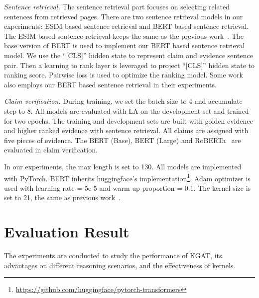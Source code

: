 \documentclass[11pt,a4paper]{article}
\begin{document}
\textit{Sentence retrieval.} The sentence retrieval part focuses on selecting related sentences from retrieved pages. There are two sentence retrieval models in our experiments: ESIM based sentence retrieval and BERT based sentence retrieval. The ESIM based sentence retrieval keeps the same as the previous work~\cite{hanselowski2018ukp,zhou2019gear}.
The base version of BERT is used to implement our BERT based sentence retrieval model. We use the ``[CLS]'' hidden state to represent claim and evidence sentence pair. Then a learning to rank layer is leveraged to project ``[CLS]'' hidden state to ranking score. Pairwise loss is used to optimize the ranking model. Some work~\cite{Zhao2020transformerxh,Ye2020coreferentialRL} also employs our BERT based sentence retrieval in their experiments.

\textit{Claim verification.} During training, we set the batch size to 4 and accumulate step to 8. All models are evaluated with LA on the development set and trained for two epochs. The training and development sets are built with golden evidence and higher ranked evidence with sentence retrieval. All claims are assigned with five pieces of evidence.
The BERT (Base), BERT (Large) and RoBERTa~\cite{liu2019roberta} are evaluated in claim verification.

In our experiments, the max length is set to 130. All models are implemented with PyTorch. BERT inherits huggingface's implementation\footnote{\url{https://github.com/huggingface/pytorch-transformers}}. Adam optimizer is used with learning rate = 5e-5 and warm up proportion = 0.1. The kernel size is set to 21, the same as previous work~\cite{qiao2019understanding}.

\section{Evaluation Result}
The experiments are conducted to study the performance of KGAT, its advantages on different reasoning scenarios, and the effectiveness of kernels.
\end{document}

